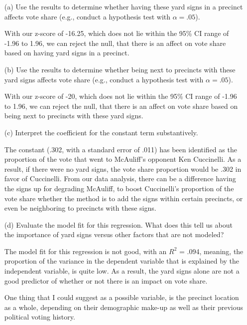 \documentclass[12pt,letterpaper]{article}
\begin{document}
\vspace{.5cm}
\begin{enumerate}
	\item [(a)] Use the results to determine whether having these yard signs in a precinct affects vote share (e.g., conduct a hypothesis test with $\alpha = .05$).


With our z-score of -16.25, which does not lie within the 95\% CI range of -1.96 to 1.96, we can reject the null, that there is an affect on vote share based on having yard signs in a precinct.
	
	\item [(b)]  Use the results to determine whether being
	next to precincts with these yard signs affects vote
	share (e.g., conduct a hypothesis test with $\alpha = .05$).
	
	
		With our z-score of -20, which does not lie within the 95\% CI range of -1.96 to 1.96, we can reject the null, that there is an affect on vote share based on being next to precincts with these yard signs.
	\vspace{1.5cm}
	\item [(c)] Interpret the coefficient for the constant term substantively.	
	
	The constant (.302, with a standard error of .011) has been identified as the proportion of the vote that went to McAuliff’s opponent Ken Cuccinelli. As a result, if there were no yard signs, the vote share proportion would be .302 in favor of Cuccinelli. From our data analysis, there can be a difference having the signs up for degrading McAuliff, to boost Cuccinelli's proportion of the vote share whether the method is to add the signs within certain precincts, or even be neighboring to precincts with these signs. 
\vspace{1.5cm}
	
	\item [(d)] Evaluate the model fit for this regression.  What does this	tell us about the importance of yard signs versus other factors that are not modeled?
	
	The model fit for this regression is not good, with an $R^2$ = .094, meaning, the proportion of the variance in the dependent variable that is explained by the independent variable, is quite low. As a result, the yard signs alone are not a good predictor of whether or not there is an impact on vote share. 
	
	One thing that I could suggest as a possible variable, is the precinct location as a whole, depending on their demographic make-up as well as their previous political voting history. 
\end{enumerate}  

\newpage
\end{document}
